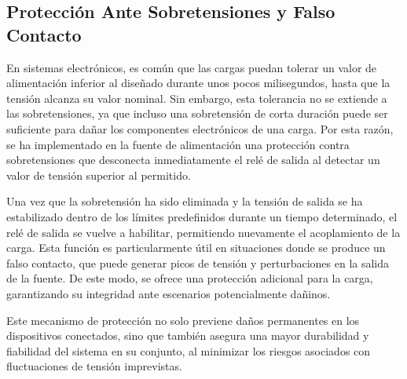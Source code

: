 \subsection{Protección Ante Sobretensiones y Falso Contacto}
En sistemas electrónicos, es común que las cargas puedan tolerar un valor de alimentación inferior al diseñado durante unos pocos milisegundos, hasta que la tensión alcanza su valor nominal. Sin embargo, esta tolerancia no se extiende a las sobretensiones, ya que incluso una sobretensión de corta duración puede ser suficiente para dañar los componentes electrónicos de una carga. Por esta razón, se ha implementado en la fuente de alimentación una protección contra sobretensiones que desconecta inmediatamente el relé de salida al detectar un valor de tensión superior al permitido.\par
Una vez que la sobretensión ha sido eliminada y la tensión de salida se ha estabilizado dentro de los límites predefinidos durante un tiempo determinado, el relé de salida se vuelve a habilitar, permitiendo nuevamente el acoplamiento de la carga. Esta función es particularmente útil en situaciones donde se produce un falso contacto, que puede generar picos de tensión y perturbaciones en la salida de la fuente. De este modo, se ofrece una protección adicional para la carga, garantizando su integridad ante escenarios potencialmente dañinos.\par
Este mecanismo de protección no solo previene daños permanentes en los dispositivos conectados, sino que también asegura una mayor durabilidad y fiabilidad del sistema en su conjunto, al minimizar los riesgos asociados con fluctuaciones de tensión imprevistas. \par
